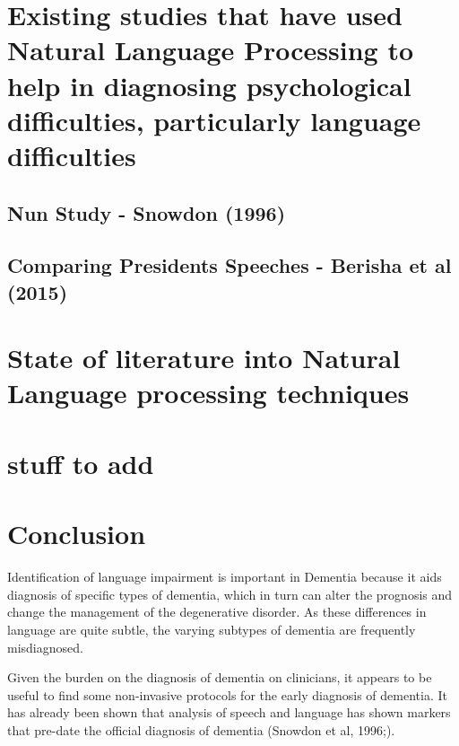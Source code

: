 \documentclass[a4paper]{article}
\begin{document}
\section{Existing studies that have used Natural Language Processing to help in diagnosing psychological difficulties, particularly language difficulties}

\subsection{Nun Study - Snowdon (1996)}
\subsection{Comparing Presidents Speeches - Berisha et al (2015)}

\section{State of literature into Natural Language processing techniques}


\section{stuff to add}
\section{Conclusion}
\par
Identification of language impairment is important in Dementia because it aids diagnosis of specific types of dementia, which in turn can alter the prognosis and change the management of the degenerative disorder. As these differences in language are quite subtle, the varying subtypes of dementia are frequently misdiagnosed.
\newline
\par 
Given the burden on the diagnosis of dementia on clinicians, it appears to be useful to find some non-invasive protocols for the early diagnosis of dementia. It has already been shown that analysis of speech and language has shown markers that pre-date the official diagnosis of dementia (Snowdon et al, 1996;)\cite{Berisha2015}.



\end{document}
